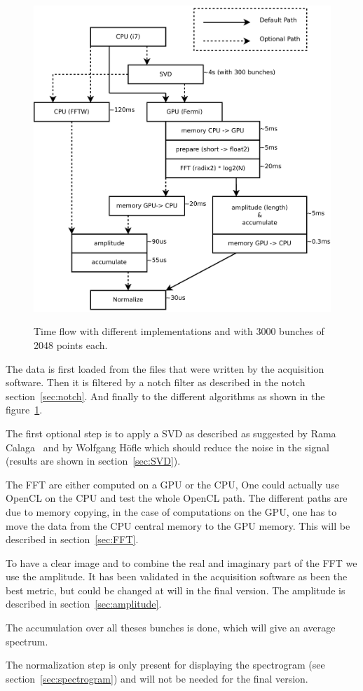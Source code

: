 \begin{figure}[H]
\caption{Time f\/low with different implementations and with 3000 bunches of 2048 points each.}
\centering
\includegraphics[scale=0.3]{PC-flow.pdf}
\label{fig:PCFlow}
\end{figure}

The data is first loaded from the files that were written by the acquisition software. Then it is filtered by a notch filter as described in the notch section~\ref{sec:notch}. And finally to the different algorithms as shown in the figure~\ref{fig:PCFlow}.

The first optional step is to apply a \gls{SVD} as described as suggested by Rama Calaga~\cite{PhysRevSTAB.7.042801} and by Wolfgang H{\"o}f\/le\cite{HofleChamonix12} which should reduce the noise in the signal (results are shown in section~\ref{sec:SVD}).

The \gls{FFT} are either computed on a \gls{GPU} or the \gls{CPU}, One could actually use \gls{OpenCL} on the \gls{CPU} and test the whole \gls{OpenCL} path. The different paths are due to memory copying, in the case of computations on the \gls{GPU}, one has to move the data from the \gls{CPU} central memory to the \gls{GPU} memory. This will be described in section~\ref{sec:FFT}.

To have a clear image and to combine the real and imaginary part of the \gls{FFT} we use the amplitude. It has been validated in the acquisition software as been the best metric, but could be changed at will in the final version. The amplitude is described in section~\ref{sec:amplitude}.

The accumulation over all theses bunches is done, which will give an average spectrum.

The normalization step is only present for displaying the spectrogram (see section~\ref{sec:spectrogram}) and will not be needed for the final version.
